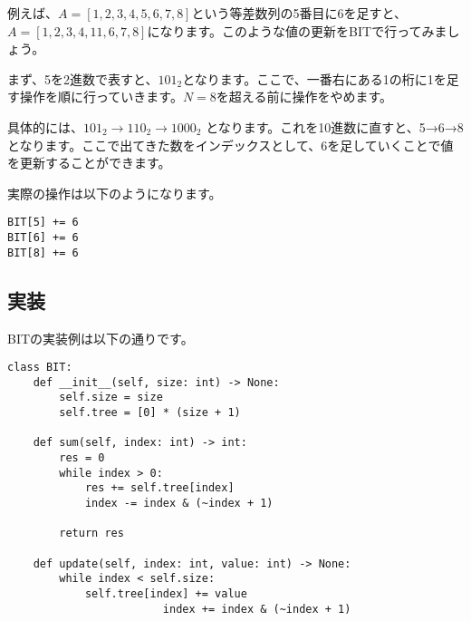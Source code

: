 例えば、$A = [1, 2, 3, 4, 5, 6, 7, 8]$という等差数列の5番目に6を足すと、$A = [1, 2, 3, 4, 11, 6, 7, 8]$になります。このような値の更新をBITで行ってみましょう。

まず、5を2進数で表すと、$101_2$となります。ここで、一番右にある1の桁に1を足す操作を順に行っていきます。$N = 8$を超える前に操作をやめます。

具体的には、$101_2 \rightarrow 110_2 \rightarrow 1000_2$ となります。これを10進数に直すと、5→6→8となります。ここで出てきた数をインデックスとして、6を足していくことで値を更新することができます。

実際の操作は以下のようになります。

\begin{verbatim}
BIT[5] += 6
BIT[6] += 6
BIT[8] += 6
\end{verbatim}

\subsection{実装}
BITの実装例は以下の通りです。

\begin{lstlisting}[caption=BITの実装, label=bit, frame=TRBL, label={bit}]
	class BIT:
    def __init__(self, size: int) -> None:
        self.size = size
        self.tree = [0] * (size + 1)
    
    def sum(self, index: int) -> int:
        res = 0
        while index > 0:
            res += self.tree[index]
            index -= index & (~index + 1)
        
        return res
    
    def update(self, index: int, value: int) -> None:
        while index < self.size:
            self.tree[index] += value
						index += index & (~index + 1)
\end{lstlisting}
